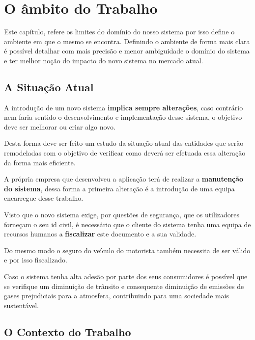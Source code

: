 \chapter{O âmbito do Trabalho}

\hspace{5mm} Este capítulo, refere os limites do domínio do nosso sistema por isso define o ambiente em que o mesmo se encontra. Definindo o ambiente de forma mais clara é possível detalhar com mais precisão e menor ambiguidade o domínio do sistema e ter melhor noção do impacto do novo sistema no mercado atual.

\section{A Situação Atual}

\hspace{5mm} A introdução de um novo sistema \textbf{implica sempre alterações}, caso contrário nem faria sentido o desenvolvimento e implementação desse sistema, o objetivo deve ser melhorar ou criar algo novo.

\hspace{5mm} Desta forma deve ser feito um estudo da situação atual das entidades que serão remodeladas com o objetivo de verificar como deverá ser efetuada essa alteração da forma mais eficiente.

\hspace{5mm} A própria empresa que desenvolveu a aplicação terá de realizar a \textbf{manutenção do sistema}, dessa forma a primeira alteração é a introdução de uma equipa encarregue desse trabalho.

\hspace{5mm} Visto que o novo sistema exige, por questões de segurança, que os utilizadores forneçam o seu id civil, é necessário que o cliente do sistema tenha uma equipa de recursos humanos a \textbf{fiscalizar} este documento e a sua validade.

\hspace{5mm} Do mesmo modo o seguro do veículo do motorista também necessita de ser válido e por isso fiscalizado.

\hspace{5mm} Caso o sistema tenha alta adesão por parte dos seus consumidores é possível que se verifique um diminuição de trânsito e consequente diminuição de emissões de gases prejudiciais para a atmosfera, contribuindo para uma sociedade mais sustentável.

\section{O Contexto do Trabalho}

